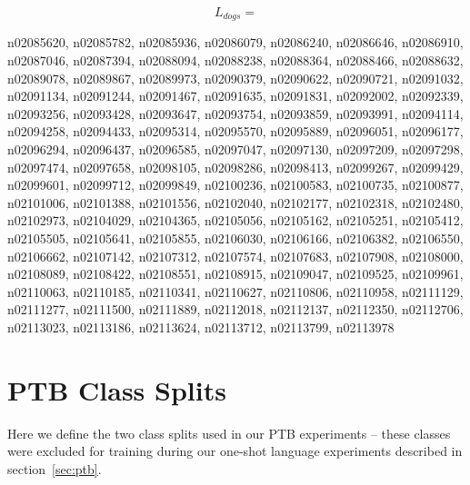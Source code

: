 $$L_{dogs}=$${\scriptsize n02085620, n02085782, n02085936, n02086079, n02086240, n02086646, n02086910, n02087046, n02087394, n02088094, n02088238, n02088364, n02088466, n02088632, n02089078, n02089867, n02089973, n02090379, n02090622, n02090721, n02091032, n02091134, n02091244, n02091467, n02091635, n02091831, n02092002, n02092339, n02093256, n02093428, n02093647, n02093754, n02093859, n02093991, n02094114, n02094258, n02094433, n02095314, n02095570, n02095889, n02096051, n02096177, n02096294, n02096437, n02096585, n02097047, n02097130, n02097209, n02097298, n02097474, n02097658, n02098105, n02098286, n02098413, n02099267, n02099429, n02099601, n02099712, n02099849, n02100236, n02100583, n02100735, n02100877, n02101006, n02101388, n02101556, n02102040, n02102177, n02102318, n02102480, n02102973, n02104029, n02104365, n02105056, n02105162, n02105251, n02105412, n02105505, n02105641, n02105855, n02106030, n02106166, n02106382, n02106550, n02106662, n02107142, n02107312, n02107574, n02107683, n02107908, n02108000, n02108089, n02108422, n02108551, n02108915, n02109047, n02109525, n02109961, n02110063, n02110185, n02110341, n02110627, n02110806, n02110958, n02111129, n02111277, n02111500, n02111889, n02112018, n02112137, n02112350, n02112706, n02113023, n02113186, n02113624, n02113712, n02113799, n02113978
\par
}

\section{PTB Class Splits}
Here we define the two class splits used in our PTB experiments -- these classes were excluded for training during our one-shot language experiments described in section~\ref{sec:ptb}.



